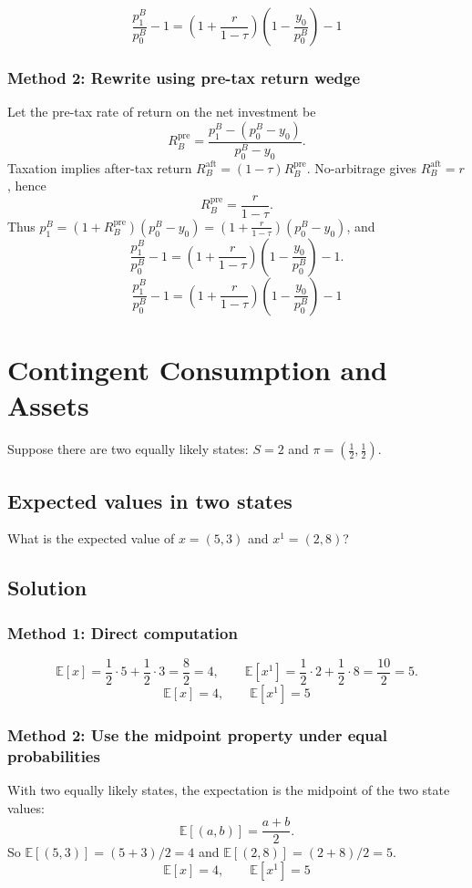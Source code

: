 \documentclass[12pt]{article}
\newcommand{\E}{\mathbb{E}}
\begin{document}
\[
\boxed{\;\frac{p^B_1}{p^B_0}-1=\left(1+\frac{r}{1-\tau}\right)\left(1-\frac{y_0}{p^B_0}\right)-1\;}
\]

\subsubsection*{Method 2: Rewrite using pre-tax return wedge}
Let the pre-tax rate of return on the net investment be
\[
R_B^{\text{pre}}=\frac{p^B_1-(p^B_0-y_0)}{p^B_0-y_0}.
\]
Taxation implies after-tax return \(R_B^{\text{aft}}=(1-\tau)R_B^{\text{pre}}\). No-arbitrage gives \(R_B^{\text{aft}}=r\), hence
\[
R_B^{\text{pre}}=\frac{r}{1-\tau}.
\]
Thus \(p^B_1=(1+R_B^{\text{pre}})(p^B_0-y_0)=\left(1+\frac{r}{1-\tau}\right)(p^B_0-y_0)\), and
\[
\frac{p^B_1}{p^B_0}-1=\left(1+\frac{r}{1-\tau}\right)\left(1-\frac{y_0}{p^B_0}\right)-1.
\]
\[
\boxed{\;\frac{p^B_1}{p^B_0}-1=\left(1+\frac{r}{1-\tau}\right)\left(1-\frac{y_0}{p^B_0}\right)-1\;}
\]

\newpage
\section{Contingent Consumption and Assets}

Suppose there are two equally likely states: \(S=2\) and \(\pi=\left(\frac12,\frac12\right)\).

\subsection{Expected values in two states}
What is the expected value of \(x=(5,3)\) and \(x^{1}=(2,8)\)?

\subsection*{Solution}
\subsubsection*{Method 1: Direct computation}
\[
\E[x]=\frac12\cdot 5+\frac12\cdot 3=\frac{8}{2}=4,
\qquad
\E[x^{1}]=\frac12\cdot 2+\frac12\cdot 8=\frac{10}{2}=5.
\]
\[
\boxed{\;\E[x]=4,\qquad \E[x^{1}]=5\;}
\]

\subsubsection*{Method 2: Use the midpoint property under equal probabilities}
With two equally likely states, the expectation is the midpoint of the two state values:
\[
\E[(a,b)]=\frac{a+b}{2}.
\]
So \(\E[(5,3)]=(5+3)/2=4\) and \(\E[(2,8)]=(2+8)/2=5\).
\[
\boxed{\;\E[x]=4,\qquad \E[x^{1}]=5\;}
\]
\end{document}
